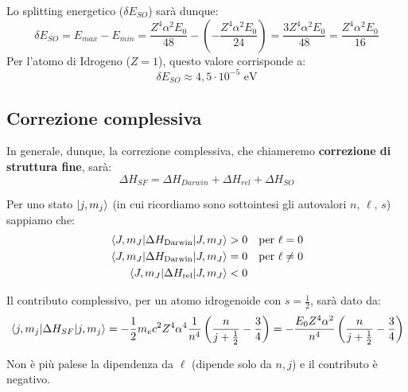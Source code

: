 \begin{exercise}
\begin{solution}
Lo splitting energetico (\( \delta E_{SO} \)) sarà dunque:
\begin{equation*}
    \delta E_{SO} = E_{max} - E_{min} = \frac{Z^4 \alpha^2 E_0}{48} - \left( - \frac{Z^4 \alpha^2 E_0}{24} \right) = \frac{3 Z^4 \alpha^2 E_0}{48} = \frac{Z^4 \alpha^2 E_0}{16}
\end{equation*}
Per l'atomo di Idrogeno (\( Z=1 \)), questo valore corrisponde a:
\begin{equation*}
    \delta E_{SO} \approx 4,5 \cdot 10^{-5} \text{ eV}
\end{equation*}
\end{solution}
\end{exercise}

\subsection{Correzione complessiva}
In generale, dunque, la correzione complessiva, che chiameremo \textbf{correzione di struttura fine}, sarà:
\begin{equation}
    \Delta H_{SF} =  \Delta H_{Darwin} + \Delta H_{rel} + \Delta H_{SO}
\end{equation}

Per uno stato \(\ket{j, m_{j}}\) (in cui ricordiamo sono sottointesi gli autovalori \(n,\,\ell,\,s\)) sappiamo che:
\begin{align}
    \mel{J, m_J}{\Delta H_{\text{Darwin}}}{J, m_J}&> 0 \quad \text{per } \ell = 0\\
    \mel{J, m_J}{\Delta H_{\text{Darwin}}}{J, m_J} &= 0 \quad \text{per } \ell \neq 0 \\
    \mel{J, m_J}{\Delta H_{\text{rel}}}{J, m_J} &< 0
\end{align}

Il contributo complessivo, per un atomo idrogenoide con \(s=\frac12\), sarà dato da:
\begin{equation}
    \mel{j, m_j}{\Delta H_{SF}}{j, m_j} = - \frac{1}{2} m_e c^2 Z^4 \alpha^4 \frac{1}{n^4} \left( \frac{n}{j + \frac{1}{2}} - \frac{3}{4} \right) = - \frac{E_0 Z^4 \alpha^2}{n^4} \left( \frac{n}{j + \frac{1}{2}} - \frac{3}{4} \right)
\end{equation}

\begin{remark}
    Non è più palese la dipendenza da \(\ell\) (dipende solo da \(n, j\)) e il contributo è negativo.
\end{remark}

